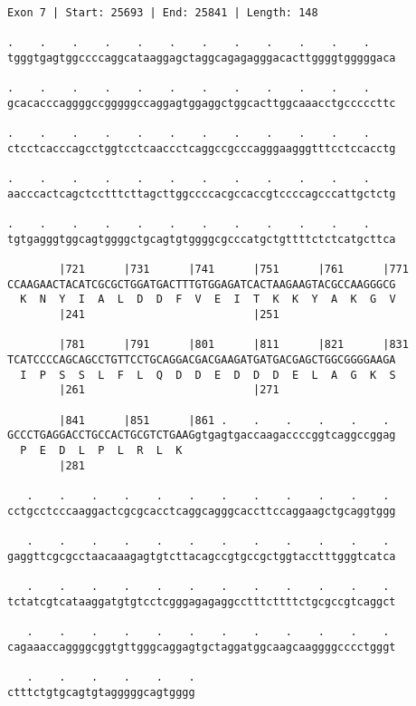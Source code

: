 \documentclass{article}
\begin{document}
\begin{Verbatim}[fontfamily=courier]
Exon 7 | Start: 25693 | End: 25841 | Length: 148

.    .    .    .    .    .    .    .    .    .    .    .    
tgggtgagtggccccaggcataaggagctaggcagagagggacacttggggtgggggaca

.    .    .    .    .    .    .    .    .    .    .    .    
gcacacccaggggccgggggccaggagtggaggctggcacttggcaaacctgcccccttc

.    .    .    .    .    .    .    .    .    .    .    .    
ctcctcacccagcctggtcctcaaccctcaggccgcccagggaagggtttcctccacctg

.    .    .    .    .    .    .    .    .    .    .    .    
aacccactcagctcctttcttagcttggccccacgccaccgtccccagcccattgctctg

.    .    .    .    .    .    .    .    .    .    .    .    
tgtgagggtggcagtggggctgcagtgtggggcgcccatgctgttttctctcatgcttca

        |721      |731      |741      |751      |761      |771
CCAAGAACTACATCGCGCTGGATGACTTTGTGGAGATCACTAAGAAGTACGCCAAGGGCG
  K  N  Y  I  A  L  D  D  F  V  E  I  T  K  K  Y  A  K  G  V
        |241                          |251                  

        |781      |791      |801      |811      |821      |831
TCATCCCCAGCAGCCTGTTCCTGCAGGACGACGAAGATGATGACGAGCTGGCGGGGAAGA
  I  P  S  S  L  F  L  Q  D  D  E  D  D  D  E  L  A  G  K  S
        |261                          |271                  

        |841      |851      |861 .    .    .    .    .    . 
GCCCTGAGGACCTGCCACTGCGTCTGAAGgtgagtgaccaagaccccggtcaggccggag
  P  E  D  L  P  L  R  L  K                                 
        |281                                                

   .    .    .    .    .    .    .    .    .    .    .    . 
cctgcctcccaaggactcgcgcacctcaggcagggcaccttccaggaagctgcaggtggg

   .    .    .    .    .    .    .    .    .    .    .    . 
gaggttcgcgcctaacaaagagtgtcttacagccgtgccgctggtacctttgggtcatca

   .    .    .    .    .    .    .    .    .    .    .    . 
tctatcgtcataaggatgtgtcctcgggagagaggcctttcttttctgcgccgtcaggct

   .    .    .    .    .    .    .    .    .    .    .    . 
cagaaaccaggggcggtgttgggcaggagtgctaggatggcaagcaaggggcccctgggt

   .    .    .    .    .    .
ctttctgtgcagtgtagggggcagtgggg
\end{Verbatim}
\end{document}
